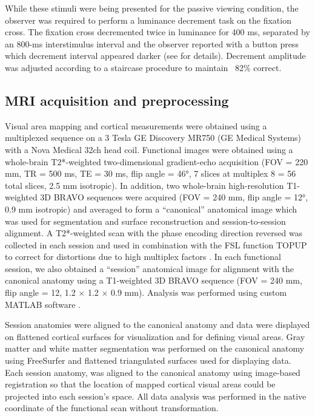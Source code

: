 \documentclass{report}
\begin{document}
While these stimuli were being presented for the passive viewing condition, the observer was required to perform a luminance decrement task on the fixation cross. The fixation cross decremented twice in luminance for 400 ms, separated by an 800-ms interstimulus interval and the observer reported with a button press which decrement interval appeared darker (see \citet{Gardner2008-yx} for details). Decrement amplitude was adjusted according to a staircase procedure to maintain ~82\% correct.

\noindent
\subsection{MRI acquisition and preprocessing}

Visual area mapping and cortical measurements were obtained using a multiplexed sequence on a 3 Tesla GE Discovery MR750 (GE Medical Systems) with a Nova Medical 32ch head coil. Functional images were obtained using a whole-brain T2*-weighted two-dimensional gradient-echo acquisition (FOV = 220 mm, TR = 500 ms, TE = 30 ms, flip angle = 46°, 7 slices at multiplex 8 = 56 total slices, 2.5 mm isotropic). In addition, two whole-brain high-resolution T1-weighted 3D BRAVO sequences were acquired (FOV = 240 mm, flip angle = 12°, 0.9 mm isotropic) and averaged to form a “canonical” anatomical image which was used for segmentation and surface reconstruction and session-to-session alignment. A T2*-weighted scan with the phase encoding direction reversed was collected in each session and used in combination with the FSL function TOPUP to correct for distortions due to high multiplex factors \citep{Andersson2003-yb}. In each functional session, we also obtained a “session” anatomical image for alignment with the canonical anatomy using a T1-weighted 3D BRAVO sequence (FOV = 240 mm, flip angle = 12\degree, 1.2 $\times$ 1.2 $\times$ 0.9 mm). Analysis was performed using custom MATLAB software \citep{Gardner2018-hf}.

Session anatomies were aligned to the canonical anatomy and data were displayed on flattened cortical surfaces for visualization and for defining visual areas. Gray matter and white matter segmentation was performed on the canonical anatomy using FreeSurfer \citep{Dale1999-oq} and flattened triangulated surfaces used for displaying data. Each session anatomy, was aligned to the canonical anatomy using image-based registration \citep{Nestares2000-by} so that the location of mapped cortical visual areas could be projected into each session’s space. All data analysis was performed in the native coordinate of the functional scan without transformation.
\end{document}
